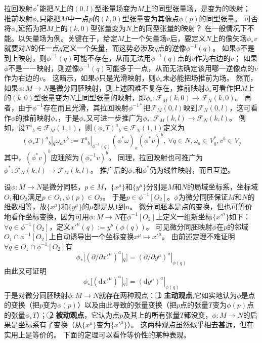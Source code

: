 \begin{note}
拉回映射$\phi^*$能把$N$上的$(0, l)$型张量场变为$M$上的同型张量场，是变为的映射；
推前映射$\phi_*$只能把$M$中一点$p$的$(k, 0)$型张量变为其像点$\phi(p)$的同型张量。
可否将$\phi_*$延拓为把$M$上的$(k, 0)$型张量变为$N$上的同型张量的映射？
在一般情况下不能。以矢量场为例。关键在于，给定$M$上一个矢量场$v$后，要定义$N$上的像矢场$\phi_*v$就要对$N$的任一点$q$定义一个矢量，而这势必涉及$q$点的逆像$\phi^{-1}(q)$。
如果$\phi$不是到上映射，则$\phi^{-1}(q)$可能不存在，从而无法用$\phi^{-1}(q)$点的$v$作为右边的$v$；
如果$\phi$不是一一映射，则逆像$\phi^{-1}(q)$可能多于一点，从而无法确定该用哪一逆像点的$v$作为右边的$v$。
这暗示，如果$\phi$只是光滑映射，则$\phi_*$未必能把场推前为场。
然而，如果$\phi \colon M \to N$是微分同胚映射，则上述困难不复存在，推前映射$\phi_*$可看作把$M$上的$(k, 0)$型张量变为$N$上同型张量的映射，即$\phi_* \colon \mathscr{F}_M(k, 0) \to \mathscr{F}_N(k, 0)$。
再者，由于$\phi^{-1}$存在而且光滑，其拉回映射$\phi^{-1*}$把$\mathscr{F}_M(0, l)$映到$\mathscr{F}_N(0, l)$，这可看作$\phi$的推前映射$\phi_*$，于是$\phi_*$又可进一步推广为$\phi_* \colon \mathscr{F}_M(k, l) \to \mathscr{F}_N(k, l)$。
例如，设$T^a{}_b \in \mathscr{F}_M(1, 1)$，则$(\phi_*T)^a{}_b \in \mathscr{F}_N(1, 1)$定义为
$$(\phi_*T)^a{}_b|_q\omega_av^b := T^a{}_b|_{\phi^{-1}(q)}(\phi^*\omega)_a(\phi^*v)^b, ~ \forall q \in N, \omega_a \in V^*_q, v^b \in V_q$$
其中，$(\phi^*v)^b$应理解为$(\phi^{-1}_*v)^b$。
同理，拉回映射也可推广为$\phi^* \colon \mathscr{F}_N(k, l) \to \mathscr{F}_M(k, l)$。
推广后的$\phi_*$和$\phi^*$仍为线性映射，而且互逆。
\end{note}

设$\phi \colon M \to N$是微分同胚，$p \in M$，$\{x^\mu\}$和$\{y^\mu\}$分别是$M$和$N$的局域坐标系，坐标域$O_1$和$O_2$满足$p \in O_1, \phi(p) \in O_2$。
于是$p \in \phi^{-1}[O_2]$。$\phi$为微分同胚保证$M$和$N$的维数相等，故$\{x^\mu\}$和$\{y^\mu\}$的$\mu$都是从$1$到$n$。
微分同胚本是点的变换，但也可等价地看作坐标变换，因为可用$\phi \colon M \to N$在$\phi^{-1}[O_2]$上定义一组新坐标$\{x'^\mu\}$如下：
$\forall q \in \phi^{-1}[O_2]$，定义$x'^\mu(q) := y^\mu(\phi(q))$。
可见微分同胚映射$\phi$在$p$的邻域$O_1 \cap \phi^{-1}[O_2]$上自动诱导出一个坐标变换$x^\mu \mapsto x'^\mu$。
由前述定理不难证明$\forall q \in O_1 \cap \phi^{-1}[O_2]$有
$$\phi_*[(\partial / \partial x'^\mu)^a|_q] = (\partial / \partial y^\mu)^a|_{\phi(q)}$$
由此又可证明
$$\phi_*[(\mathrm{d}x'^\mu)^a|_q] = (\mathrm{d}y^\mu)^a|_{\phi(q)}$$
于是对微分同胚映射$\phi \colon M \to N$就存在两种观点：
\textcircled{1} \textbf{主动观点},它如实地认为$\phi$是点的变换（把$p$变为$\phi(p)$）以及由此导致的张量变换（把$p$点的张量$T$变为$\phi(p)$点的张量$\phi_*T$）；
\textcircled{2} \textbf{被动观点}，它认为点$p$及其上的所有张量$T$都没变，$\phi \colon M \to N$的后果是坐标系有了变换（从$\{x^\mu\}$变为$\{x'^\mu\}$）。
这两种观点虽然似乎相去甚远，但在实用上是等价的。
下面的定理可以看作等价性的某种表现。

